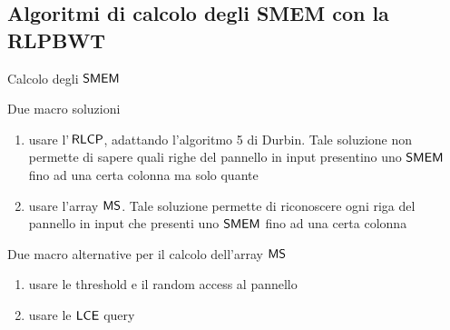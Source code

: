 \documentclass[]{beamer}
\def\LCE{\mbox{\rm {\sf LCE}}}
\def\RLCP{\mbox{\rm {\sf RLCP}}}
\def\MS{\mbox{\rm {\sf MS}}}
\def\SMEM{\mbox{\rm {\sf SMEM}}}
\def\LCE{\mbox{\rm {\sf LCE}}}
\begin{document}
\subsection{Algoritmi di calcolo degli SMEM con la RLPBWT}
\begin{frame}{Calcolo degli $\SMEM$}
  \begin{block}{Due macro soluzioni}
    \begin{enumerate}
      \item usare l'$\,\RLCP$, adattando l'algoritmo 5 di Durbin. Tale soluzione
      non permette di sapere quali righe del pannello in input presentino uno
      $\SMEM$ fino ad una certa colonna ma solo quante
      \item usare l'array $\MS$. Tale soluzione
      permette di riconoscere ogni riga del pannello in input che presenti uno
      $\SMEM$ fino ad una certa colonna
    \end{enumerate}    
  \end{block}
  \pause
  \begin{block}{Due macro alternative per il calcolo dell'array $\MS$}
    \begin{enumerate}
      \item usare le threshold e il random access al pannello
      \item usare le $\LCE$ query
    \end{enumerate}
  \end{block}
\end{frame}
\end{document}
